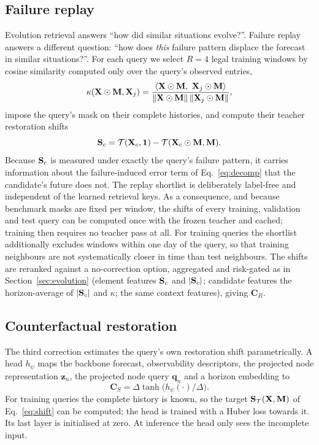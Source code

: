 \subsection{Failure replay}
\label{sec:replay}
Evolution retrieval answers ``how did similar situations evolve?''. Failure replay answers a different question: ``how does \emph{this} failure pattern displace the forecast in similar situations?''. For each query we select $R=4$ legal training windows by cosine similarity computed only over the query's observed entries,
\begin{equation}
\kappa(\X\odot\M,\X_j)=\frac{\langle \X\odot\M,\ \X_j\odot\M\rangle}{\lVert\X\odot\M\rVert\,\lVert\X_j\odot\M\rVert},
\end{equation}
impose the query's mask on their complete histories, and compute their teacher restoration shifts
\begin{equation}
\mathbf{S}_c=\mathcal{T}(\mathbf{X}_c,\mathbf{1})-\mathcal{T}(\mathbf{X}_c\odot\mathbf{M},\mathbf{M}) .
\end{equation}
Because $\mathbf{S}_c$ is measured under exactly the query's failure pattern, it carries information about the failure-induced error term of Eq.~\eqref{eq:decomp} that the candidate's future does not. The replay shortlist is deliberately label-free and independent of the learned retrieval keys. As a consequence, and because benchmark masks are fixed per window, the shifts of every training, validation and test query can be computed once with the frozen teacher and cached; training then requires no teacher pass at all. For training queries the shortlist additionally excludes windows within one day of the query, so that training neighbours are not systematically closer in time than test neighbours. The shifts are reranked against a no-correction option, aggregated and risk-gated as in Section~\ref{sec:evolution} (element features $\mathbf{S}_c$ and $|\mathbf{S}_c|$; candidate features the horizon-average of $|\mathbf{S}_c|$ and $\kappa$; the same context features), giving $\mathbf{C}_R$.

\subsection{Counterfactual restoration}
\label{sec:cf}
The third correction estimates the query's own restoration shift parametrically. A head $h_\psi$ maps the backbone forecast, observability descriptors, the projected node representation $\mathbf{z}_n$, the projected node query $\mathbf{q}_n$ and a horizon embedding to
\begin{equation}
\mathbf{C}_S=\Delta\tanh\big(h_\psi(\cdot)/\Delta\big).
\end{equation}
For training queries the complete history is known, so the target $\mathbf{S}_{\mathcal{T}}(\mathbf{X},\mathbf{M})$ of Eq.~\eqref{eq:shift} can be computed; the head is trained with a Huber loss towards it. Its last layer is initialised at zero. At inference the head only sees the incomplete input.

